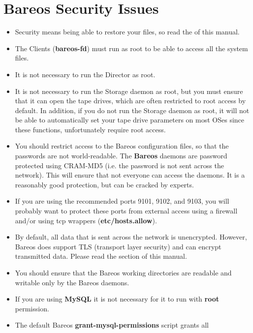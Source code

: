 
\chapter{Bareos Security Issues}
\label{SecurityChapter}

\begin{itemize}
\item Security means being able to restore your files, so read the
    of this manual.
\item The Clients ({\bf bareos-fd}) must run as root to be able to access  all
   the system files.
\item It is not necessary to run the Director as root.
\item It is not necessary to run the Storage daemon as root, but you  must
   ensure that it can open the tape drives, which are often restricted to root
   access by default. In addition, if you do not run the Storage daemon as root,
   it will not be able to automatically set your tape drive parameters on most
   OSes since these functions, unfortunately require root access.
\item You should restrict access to the Bareos configuration files,  so that
   the passwords are not world-readable. The {\bf Bareos}  daemons are password
   protected using CRAM-MD5 (i.e. the password is not  sent across the network).
   This will ensure that not everyone  can access the daemons. It is a reasonably
   good protection, but  can be cracked by experts.
\item If you are using the recommended ports 9101, 9102, and 9103, you  will
   probably want to protect these ports from external access  using a firewall
   and/or using tcp wrappers ({\bf etc/hosts.allow}).
\item By default, all data that is sent across the network is unencrypted.
   However, Bareos does support TLS (transport layer security) and can
   encrypt transmitted data.  Please read the
   section of this manual.
\item You should ensure that the Bareos working directories are  readable and
   writable only by the Bareos daemons.
\item If you are using {\bf MySQL} it is not necessary for it to  run with
   {\bf root} permission.
\item The default Bareos {\bf grant-mysql-permissions} script  grants all

\end{itemize}
